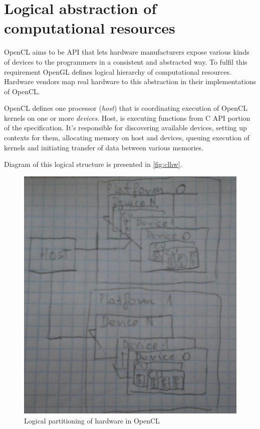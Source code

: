 \section{Logical abstraction of computational resources}

OpenCL aims to be API that lets hardware manufacturers expose various kinds of
devices to the programmers in a consistent and abstracted way. To fulfil this
requirement OpenGL defines logical hierarchy of computational resources.
Hardware vendors map real hardware to this abstraction in their implementations
of OpenCL.

OpenCL defines one processor (\emph{host}) that is coordinating execution of
OpenCL kernels on one or more \emph{devices}. Host, is executing functions from
C API portion of the specification. It's responsible for discovering available
devices, setting up contexts for them, allocating memory on host and devices,
queuing execution of kernels and initiating transfer of data between various
memories.

Diagram of this logical structure is presented in \autoref{fig:clhw}.

\begin{figure}[h]
	\begin{center}
		\includegraphics[scale=0.7]{chapters/opencl/opencl_hwmodel.jpg}
	\end{center}
	\caption{Logical partitioning of hardware in OpenCL}
	\label{fig:clhw}
\end{figure}

